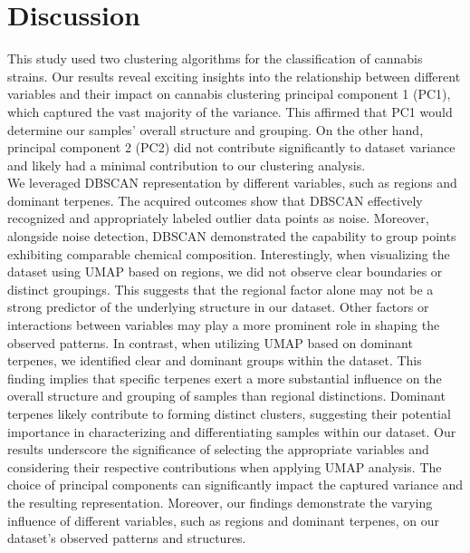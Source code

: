 \documentclass[11pt,a4paper]{article}
\newcommand{\noi}{\noindent}
\begin{document}
\section{Discussion}
This study used two clustering algorithms for the classification of cannabis strains. Our results reveal exciting insights into the relationship between different variables and their impact on cannabis clustering principal component 1 (PC1), which captured the vast majority of the variance. This affirmed that PC1 would determine our samples' overall structure and grouping. On the other hand, principal component 2 (PC2) did not contribute significantly to dataset variance and likely had a minimal contribution to our clustering analysis.\\

\noi
We leveraged DBSCAN representation by different variables, such as regions and dominant terpenes. The acquired outcomes show that DBSCAN effectively recognized and appropriately labeled outlier data points as noise. Moreover, alongside noise detection, DBSCAN demonstrated the capability to group points exhibiting comparable chemical composition. Interestingly, when visualizing the dataset using UMAP based on regions, we did not observe clear boundaries or distinct groupings. This suggests that the regional factor alone may not be a strong predictor of the underlying structure in our dataset. Other factors or interactions between variables may play a more prominent role in shaping the observed patterns. In contrast, when utilizing UMAP based on dominant terpenes, we identified clear and dominant groups within the dataset. This finding implies that specific terpenes exert a more substantial influence on the overall structure and grouping of samples than regional distinctions. Dominant terpenes likely contribute to forming distinct clusters, suggesting their potential importance in characterizing and differentiating samples within our dataset. Our results underscore the significance of selecting the appropriate variables and considering their respective contributions when applying UMAP analysis. The choice of principal components can significantly impact the captured variance and the resulting representation. Moreover, our findings demonstrate the varying influence of different variables, such as regions and dominant terpenes, on our dataset's observed patterns and structures.\\
\end{document}
